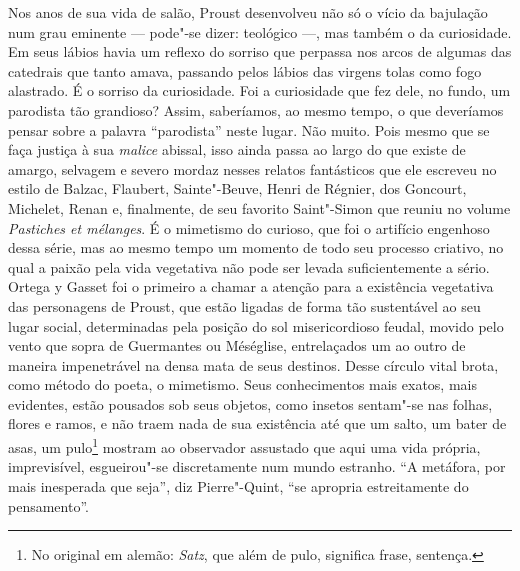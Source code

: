 Nos anos de sua vida de salão, Proust desenvolveu não só o vício da
bajulação num grau eminente --- pode"-se dizer: teológico ---, mas também o
da curiosidade. Em seus lábios havia um reflexo do sorriso que perpassa nos arcos de algumas das catedrais que tanto amava, passando pelos lábios das virgens tolas como fogo alastrado. É o sorriso da curiosidade.  Foi a curiosidade que fez dele, no fundo, um parodista tão grandioso? Assim, saberíamos, ao mesmo tempo, o que deveríamos pensar sobre a palavra ``parodista'' neste lugar. Não muito. Pois mesmo que se faça justiça à sua \emph{malice} abissal, isso ainda passa ao largo do que existe de amargo, selvagem e severo mordaz nesses relatos fantásticos que ele escreveu no estilo
de Balzac, Flaubert, Sainte"-Beuve, Henri de Régnier, dos Goncourt,
Michelet, Renan e, finalmente, de seu favorito Saint"-Simon que reuniu no
volume \emph{Pastiches et mélanges}. É o mimetismo do curioso, que foi o
artifício engenhoso dessa série, mas ao mesmo tempo um momento de todo
seu processo criativo, no qual a paixão pela vida vegetativa não pode
ser levada suficientemente a sério. Ortega y Gasset foi o primeiro a
chamar a atenção para a existência vegetativa das personagens de Proust,
que estão ligadas de forma tão sustentável ao seu lugar social,
determinadas pela posição do sol misericordioso feudal, movido pelo
vento que sopra de Guermantes ou Méséglise, entrelaçados um ao outro de
maneira impenetrável na densa mata de seus destinos. Desse círculo vital
brota, como método do poeta, o mimetismo. Seus conhecimentos mais exatos,
mais evidentes, estão pousados sob seus objetos, como insetos
sentam"-se nas folhas, flores e ramos, e não traem nada de sua
existência até que um salto, um bater de asas, um pulo\footnote{No
  original em alemão: \emph{Satz}, que além de pulo, significa frase, sentença. \versal{[N.~T.]}}
mostram ao observador assustado que aqui uma vida própria, imprevisível,
esgueirou"-se discretamente num mundo estranho. ``A metáfora, por
mais inesperada que seja'', diz Pierre"-Quint, ``se apropria
estreitamente do pensamento''.

